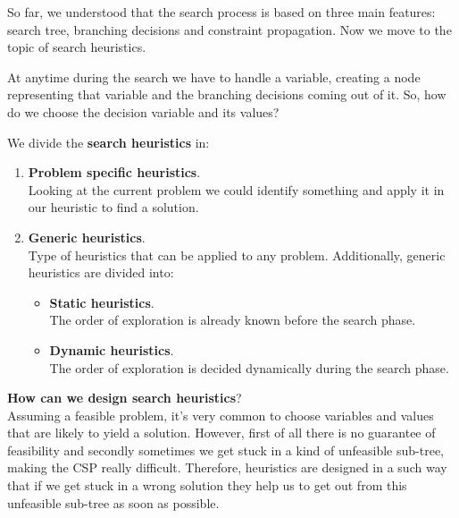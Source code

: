 So far, we understood that the search process is based on three main features: search tree, branching decisions and constraint propagation. Now we move 
to the topic of search heuristics. \vspace{7pt}

At anytime during the search we have to handle a variable, creating a node representing that variable and the branching decisions coming out of it. So,
how do we choose the decision variable and its values? \vspace{7pt}

We divide the \textbf{search heuristics} in:
\begin{enumerate}
    \item \textbf{Problem specific heuristics}. \\
    Looking at the current problem we could identify something and apply it in our heuristic to find a solution. 
    \item \textbf{Generic heuristics}. \\
    Type of heuristics that can be applied to any problem. Additionally, generic heuristics are divided into:
    \begin{itemize}
        \renewcommand{\labelitemi}{-}
        \item \textbf{Static heuristics}. \\ 
        The order of exploration is already known before the search phase.
        \item \textbf{Dynamic heuristics}. \\ 
        The order of exploration is decided dynamically during the search phase.
    \end{itemize}
\end{enumerate}

\textbf{How can we design search heuristics}? \\
Assuming a feasible problem, it's very common to choose variables and values that are likely to yield a solution. However, first of all there is no guarantee 
of feasibility and secondly sometimes we get stuck in a kind of unfeasible sub-tree, making the CSP really difficult. Therefore, heuristics are designed in a
such way that if we get stuck in a wrong solution they help us to get out from this unfeasible sub-tree as soon as possible. \vspace{7pt}

